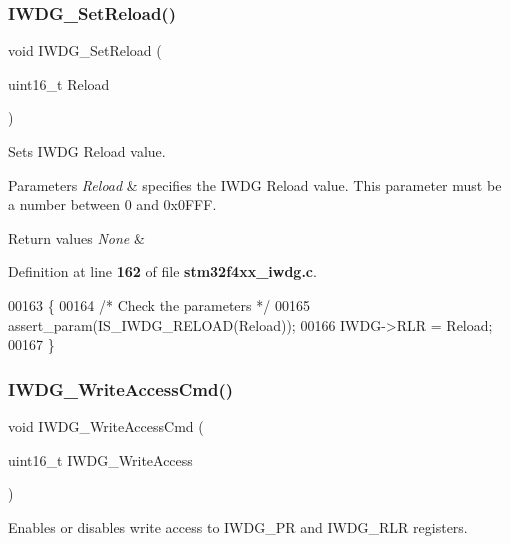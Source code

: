\subsubsection{I\+W\+D\+G\+\_\+\+Set\+Reload()}
{\footnotesize\ttfamily void I\+W\+D\+G\+\_\+\+Set\+Reload (\begin{DoxyParamCaption}\item[{uint16\+\_\+t}]{Reload }\end{DoxyParamCaption})}



Sets I\+W\+DG Reload value. 


\begin{DoxyParams}{Parameters}
{\em Reload} & specifies the I\+W\+DG Reload value. This parameter must be a number between 0 and 0x0\+F\+FF. \\
\hline
\end{DoxyParams}

\begin{DoxyRetVals}{Return values}
{\em None} & \\
\hline
\end{DoxyRetVals}


Definition at line \textbf{ 162} of file \textbf{ stm32f4xx\+\_\+iwdg.\+c}.


\begin{DoxyCode}
00163 \{
00164   \textcolor{comment}{/* Check the parameters */}
00165   assert_param(IS_IWDG_RELOAD(Reload));
00166   IWDG->RLR = Reload;
00167 \}
\end{DoxyCode}
\mbox{\label{group__IWDG__Group1_gae466681e5bdc11b353c508b89d75ca05}} 
\subsubsection{I\+W\+D\+G\+\_\+\+Write\+Access\+Cmd()}
{\footnotesize\ttfamily void I\+W\+D\+G\+\_\+\+Write\+Access\+Cmd (\begin{DoxyParamCaption}\item[{uint16\+\_\+t}]{I\+W\+D\+G\+\_\+\+Write\+Access }\end{DoxyParamCaption})}



Enables or disables write access to I\+W\+D\+G\+\_\+\+PR and I\+W\+D\+G\+\_\+\+R\+LR registers. 


